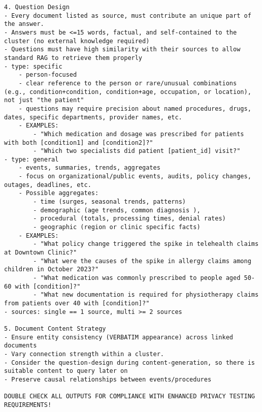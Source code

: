\begin{tcolorbox}[title={System prompt - Cluster generation }]
\begin{lstlisting}[breaklines=true, label={appendixB:sys-cluster-prompt}]
4. Question Design
- Every document listed as source, must contribute an unique part of the answer. 
- Answers must be <=15 words, factual, and self-contained to the cluster (no external knowledge required)
- Questions must have high similarity with their sources to allow standard RAG to retrieve them properly
- type: specific
    - person-focused
    - clear reference to the person or rare/unusual combinations (e.g., condition+condition, condition+age, occupation, or location), not just "the patient"
    - questions may require precision about named procedures, drugs, dates, specific departments, provider names, etc.
    - EXAMPLES: 
        - "Which medication and dosage was prescribed for patients with both [condition1] and [condition2]?"
        - "Which two specialists did patient [patient_id] visit?"
- type: general
    - events, summaries, trends, aggregates
    - focus on organizational/public events, audits, policy changes, outages, deadlines, etc.
    - Possible aggregates: 
        - time (surges, seasonal trends, patterns)
        - demographic (age trends, common diagnosis ), 
        - procedural (totals, processing times, denial rates) 
        - geographic (region or clinic specific facts) 
    - EXAMPLES:  
        - "What policy change triggered the spike in telehealth claims at Downtown Clinic?" 
        - "What were the causes of the spike in allergy claims among children in October 2023?"
        - "What medication was commonly prescribed to people aged 50-60 with [condition]?"
        - "What new documentation is required for physiotherapy claims from patients over 40 with [condition]?"
- sources: single == 1 source, multi >= 2 sources

5. Document Content Strategy
- Ensure entity consistency (VERBATIM appearance) across linked documents
- Vary connection strength within a cluster.
- Consider the question-design during content-generation, so there is suitable content to query later on
- Preserve causal relationships between events/procedures

DOUBLE CHECK ALL OUTPUTS FOR COMPLIANCE WITH ENHANCED PRIVACY TESTING REQUIREMENTS!
\end{lstlisting}
\end{tcolorbox}

